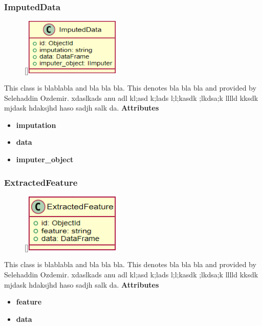 \subsubsection{ImputedData}
\begin{figure}
    \raisebox{0pt}[\dimexpr{}\baselineskip\relax]{\includegraphics[width=4.5cm]{classes/model-management/16.png}}
\end{figure} 
\par
This class is blablabla and bla bla bla. This denotes bla bla bla and provided by Selehaddin Ozdemir. xdaslkads anu adl kl;asd k;lads l;l;kasdk ;lkdsa;k lllld kksdk mjdask hdaksjhd haso sadjh salk da.
\newline
\newline
\textbf{Attributes}
\begin{itemize}
    \item \textbf{imputation}
    \item \textbf{data}
    \item \textbf{imputer\_object}
\end{itemize}

\subsubsection{ExtractedFeature}
\begin{figure}
    \raisebox{0pt}[\dimexpr{}\baselineskip\relax]{\includegraphics[width=4.5cm]{classes/model-management/17.png}}
\end{figure} 
\par
This class is blablabla and bla bla bla. This denotes bla bla bla and provided by Selehaddin Ozdemir. xdaslkads anu adl kl;asd k;lads l;l;kasdk ;lkdsa;k lllld kksdk mjdask hdaksjhd haso sadjh salk da.
\newline
\newline
\textbf{Attributes}
\begin{itemize}
    \item \textbf{feature}
    \item \textbf{data}
\end{itemize}
